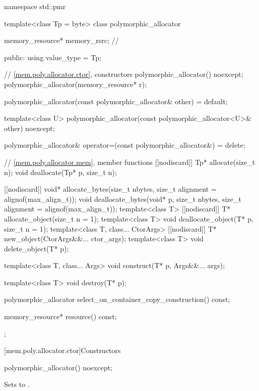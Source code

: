 %
%
\begin{codeblock}
namespace std::pmr {
  template<class Tp = byte> class polymorphic_allocator {
    memory_resource* memory_rsrc;       // \expos

  public:
    using value_type = Tp;

    // \ref{mem.poly.allocator.ctor}, constructors
    polymorphic_allocator() noexcept;
    polymorphic_allocator(memory_resource* r);

    polymorphic_allocator(const polymorphic_allocator& other) = default;

    template<class U>
      polymorphic_allocator(const polymorphic_allocator<U>& other) noexcept;

    polymorphic_allocator& operator=(const polymorphic_allocator&) = delete;

    // \ref{mem.poly.allocator.mem}, member functions
    [[nodiscard]] Tp* allocate(size_t n);
    void deallocate(Tp* p, size_t n);

    [[nodiscard]] void* allocate_bytes(size_t nbytes, size_t alignment = alignof(max_align_t));
    void deallocate_bytes(void* p, size_t nbytes, size_t alignment = alignof(max_align_t));
    template<class T> [[nodiscard]] T* allocate_object(size_t n = 1);
    template<class T> void deallocate_object(T* p, size_t n = 1);
    template<class T, class... CtorArgs> [[nodiscard]] T* new_object(CtorArgs&&... ctor_args);
    template<class T> void delete_object(T* p);

    template<class T, class... Args>
      void construct(T* p, Args&&... args);

    template<class T>
      void destroy(T* p);

    polymorphic_allocator select_on_container_copy_construction() const;

    memory_resource* resource() const;
  };
}
\end{codeblock}

[mem.poly.allocator.ctor]{Constructors}

%
\begin{itemdecl}
polymorphic_allocator() noexcept;
\end{itemdecl}

\begin{itemdescr}
\pnum
\effects
Sets  to .
\end{itemdescr}

